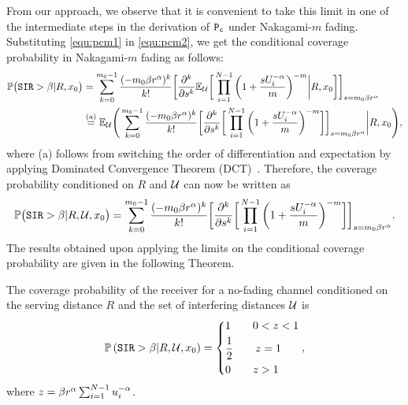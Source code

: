 \documentclass[journal,draftclsnofoot,onecolumn,12pt]{IEEEtran}
\begin{document}
From our approach, we observe that it is convenient to take this limit in one of the intermediate steps in the derivation of $\mathtt{P_c}$ under Nakagami-$m$ fading. Substituting \eqref{equ:pcm1} in \eqref{equ:pcm2}, we get the conditional coverage probability in Nakagami-$m$ fading as follows:
\begin{align} \notag
\mathbb{P}\big( \mathtt{SIR} > \beta | R, x_0\big) &= \sum_{k=0}^{m_0-1} \frac{(-m_0 \beta r^{\alpha})^k}{k!} \bigg[ \frac{\partial^k}{\partial s^k} {\mathbb{E}}_{{\mathcal{U}}} \bigg[ \prod_{i=1}^{N-1} \bigg(1 + \frac{s U_i^{-\alpha}}{m} \bigg)^{-m} \bigg| R, x_0\bigg] \bigg]_{s=m_0 \beta r^{\alpha}} \\
&\stackrel{(a)}{=} {\mathbb{E}}_{{\mathcal{U}}} \Bigg(\sum_{k=0}^{m_0-1} \frac{(-m_0 \beta r^{\alpha})^k}{k!} \bigg[ \frac{\partial^k}{\partial s^k} \bigg[ \prod_{i=1}^{N-1} \bigg(1 + \frac{s U_i^{-\alpha}}{m} \bigg)^{-m} \bigg] \bigg]_{s=m_0 \beta r^{\alpha}} \bigg| R, x_0 \Bigg),
\end{align}
where (a) follows from switching the order of differentiation and expectation by applying Dominated Convergence Theorem (DCT)~\cite{dct}.
Therefore, the coverage probability conditioned on $R$ and ${\mathcal{U}}$ can now be written as
\begin{align}\label{equ:pcm3}
\mathbb{P}\big( \mathtt{SIR} > \beta | R, {\mathcal{U}}, x_0\big) = \sum_{k=0}^{m_0-1} \frac{(-m_0 \beta r^{\alpha})^k}{k!} \bigg[ \frac{\partial^k}{\partial s^k} \bigg[ \prod_{i=1}^{N-1} \bigg(1 + \frac{s U_i^{-\alpha}}{m} \bigg)^{-m} \bigg] \bigg]_{s=m_0 \beta r^{\alpha}} .
\end{align}
The results obtained upon applying the limits on the conditional coverage probability are given in the following Theorem.%
\begin{thm}
The coverage probability of the receiver for a no-fading channel conditioned on the serving distance $R$ and the set of interfering distances ${\mathcal{U}}$ is
\begin{equation}
\mathbb{P}\left( \mathtt{SIR} > \beta | R, {\mathcal{U}}, x_0\right) = \begin{dcases}
1 \qquad 0<z<1 \\
\frac{1}{2} \qquad z=1 \\
0 \qquad z>1
\end{dcases},
\end{equation}
where $z=\beta r^{\alpha} \sum_{i=1}^{N-1}u_i^{-\alpha}$.
\end{thm}
\end{document}
